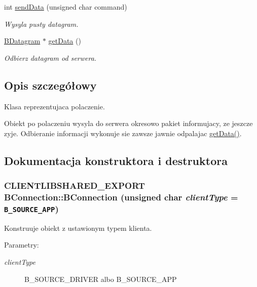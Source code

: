 \begin{CompactItemize}
int \hyperlink{class_b_connection_e6e720ac6a03bd3672ab440eb1e9b8c5}{sendData} (unsigned char command)
\begin{CompactList}\small\item\em Wysyla pusty datagram. \item\end{CompactList}\item 
\hyperlink{class_b_datagram}{BDatagram} $\ast$ \hyperlink{class_b_connection_68fb4ff5ee98e5228378d08a2fe2ae19}{getData} ()
\begin{CompactList}\small\item\em Odbierz datagram od serwera. \item\end{CompactList}\end{CompactItemize}


\subsection{Opis szczegółowy}
Klasa reprezentujaca polaczenie. 

Obiekt po polaczeniu wysyla do serwera okresowo pakiet informujacy, ze jeszcze zyje. Odbieranie informacji wykonuje sie zawsze jawnie odpalajac \hyperlink{class_b_connection_68fb4ff5ee98e5228378d08a2fe2ae19}{getData()}. 

\subsection{Dokumentacja konstruktora i destruktora}
\hypertarget{class_b_connection_9b85170ee6ea831111b50a55d45ef8eb}{
\subsubsection[{BConnection}]{\setlength{\rightskip}{0pt plus 5cm}CLIENTLIBSHARED\_\-EXPORT BConnection::BConnection (unsigned char {\em clientType} = {\tt B\_\-SOURCE\_\-APP})}}
\label{class_b_connection_9b85170ee6ea831111b50a55d45ef8eb}


Konstruuje obiekt z ustawionym typem klienta. 

\begin{Desc}
\item[Parametry:]
\begin{description}
\item[{\em clientType}]B\_\-SOURCE\_\-DRIVER albo B\_\-SOURCE\_\-APP \end{description}
\end{Desc}


